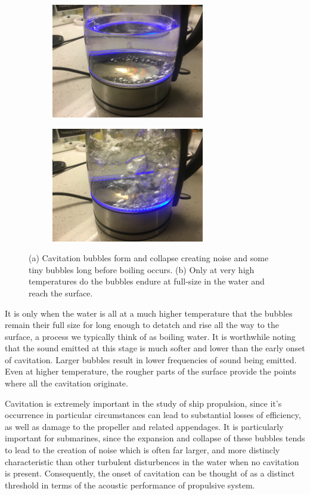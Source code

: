 \documentclass{article}\usepackage[]{graphicx}\usepackage[]{color}
\begin{document}
\begin{appendices}
\begin{figure}[h]
\begin{subfigure}{0.5\textwidth}
\includegraphics[width=0.9\linewidth, height=5cm]{EarlyCavitation.JPG}
\caption{}
\end{subfigure}
\begin{subfigure}{0.5\textwidth}
\includegraphics[width=0.9\linewidth, height=5cm]{BoilingCavitation.JPG}
\caption{}
\end{subfigure}

\caption{(a) Cavitation bubbles form and collapse creating noise and some tiny bubbles long before boiling occurs. (b) Only at very high temperatures do the bubbles endure at full-size in the water and reach the surface.}
\label{fig:EarlyCavitation.JPG}
\end{figure}

It is only when the water is all at a much higher temperature that the bubbles remain their full size for long enough to detatch and rise all the way to the surface, a process we typically think of as boiling water.  It is worthwhile noting that the sound emitted at this stage is much softer and lower than the early onset of cavitation. Larger bubbles result in lower frequencies of sound being emitted. Even at higher temperature, the rougher parts of the surface provide the points where all the cavitation originate.


Cavitation is extremely important in the study of ship propulsion, since it's occurrence in particular circumstances can lead to substantial losses of efficiency, as well as damage to the propeller and related appendages. It is particularly important for submarines, since the expansion and collapse of these bubbles tends to lead to the creation of noise which is often far larger, and more distincly characteristic than other turbulent disturbences in the water when no cavitation is present.  Consequently, the onset of cavitation can be thought of as a distinct threshold in terms of the acoustic performance of propulsive system.


\end{appendices}
\end{document}
